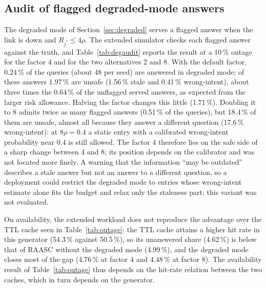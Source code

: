 \documentclass[journal]{IEEEtran}
\newcommand{\pct}{\,\%}
\begin{document}
\subsection{Audit of flagged degraded-mode answers}\label{sec:degaudit}
The degraded mode of Section~\ref{sec:degraded} serves a flagged answer when the link is down and $R_{j^{*}}\le 4\rho$. The extended simulator checks each flagged answer against the truth, and Table~\ref{tab:degaudit} reports the result at a 10\pct{} outage for the factor 4 and for the two alternatives 2 and 8. With the default factor, 0.24\pct{} of the queries (about 48 per seed) are answered in degraded mode; of these answers 1.97\pct{} are unsafe (1.56\pct{} stale and 0.41\pct{} wrong-intent), about three times the 0.64\pct{} of the unflagged served answers, as expected from the larger risk allowance. Halving the factor changes this little (1.71\pct{}). Doubling it to 8 admits twice as many flagged answers (0.51\pct{} of the queries), but 18.4\pct{} of them are unsafe, almost all because they answer a different question (17.6\pct{} wrong-intent): at $8\rho=0.4$ a static entry with a calibrated wrong-intent probability near 0.4 is still allowed. The factor 4 therefore lies on the safe side of a sharp change between 4 and 8; its position depends on the calibrator and was not located more finely. A warning that the information ``may be outdated'' describes a stale answer but not an answer to a different question, so a deployment could restrict the degraded mode to entries whose wrong-intent estimate alone fits the budget and relax only the staleness part; this variant was not evaluated.

On availability, the extended workload does not reproduce the advantage over the TTL cache seen in Table~\ref{tab:outage}: the TTL cache attains a higher hit rate in this generator (54.3\pct{} against 50.5\pct{}), so its unanswered share (4.62\pct{}) is below that of RAASC without the degraded mode (4.99\pct{}), and the degraded mode closes most of the gap (4.76\pct{} at factor 4 and 4.48\pct{} at factor 8). The availability result of Table~\ref{tab:outage} thus depends on the hit-rate relation between the two caches, which in turn depends on the generator.
\end{document}
